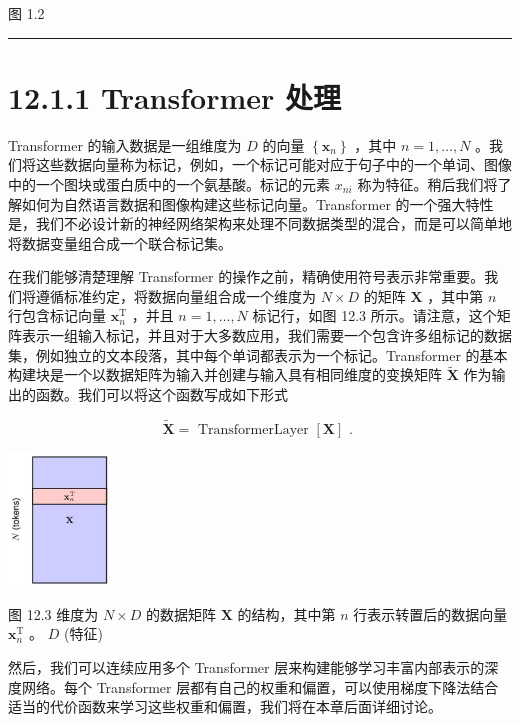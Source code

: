 \documentclass[10pt]{article}
\newcommand{\HRule}{\begin{center}\rule{0.9\linewidth}{0.2mm}\end{center}}
\begin{document}
图 1.2

\HRule

\section*{12.1.1 Transformer 处理}

Transformer 的输入数据是一组维度为 \(D\) 的向量 \(\left\{  {\mathbf{x}}_{n}\right\}\) ，其中 \(n = 1,\ldots ,N\) 。我们将这些数据向量称为标记，例如，一个标记可能对应于句子中的一个单词、图像中的一个图块或蛋白质中的一个氨基酸。标记的元素 \({x}_{ni}\) 称为特征。稍后我们将了解如何为自然语言数据和图像构建这些标记向量。Transformer 的一个强大特性是，我们不必设计新的神经网络架构来处理不同数据类型的混合，而是可以简单地将数据变量组合成一个联合标记集。

在我们能够清楚理解 Transformer 的操作之前，精确使用符号表示非常重要。我们将遵循标准约定，将数据向量组合成一个维度为 \(N \times  D\) 的矩阵 \(\mathbf{X}\) ，其中第 \(n\) 行包含标记向量 \({\mathbf{x}}_{n}^{\mathrm{T}}\) ，并且 \(n = 1,\ldots ,N\) 标记行，如图 12.3 所示。请注意，这个矩阵表示一组输入标记，并且对于大多数应用，我们需要一个包含许多组标记的数据集，例如独立的文本段落，其中每个单词都表示为一个标记。Transformer 的基本构建块是一个以数据矩阵为输入并创建与输入具有相同维度的变换矩阵 \(\widetilde{\mathbf{X}}\) 作为输出的函数。我们可以将这个函数写成如下形式

\[
\widetilde{\mathbf{X}} = \text{ TransformerLayer }\left\lbrack  \mathbf{X}\right\rbrack  \text{ . } \tag{12.1}
\]

\begin{center}
\includegraphics[max width=0.2\textwidth]{images/0194e279-9b28-703a-88f4-c3ac21e2010d_380_1076_344_303_404_0.jpg}
\end{center}
\hspace*{3em} 

图 12.3 维度为 \(N \times  D\) 的数据矩阵 \(\mathbf{X}\) 的结构，其中第 \(n\) 行表示转置后的数据向量 \({\mathbf{x}}_{n}^{\mathrm{T}}\) 。 \(D\) (特征)

然后，我们可以连续应用多个 Transformer 层来构建能够学习丰富内部表示的深度网络。每个 Transformer 层都有自己的权重和偏置，可以使用梯度下降法结合适当的代价函数来学习这些权重和偏置，我们将在本章后面详细讨论。
\end{document}
